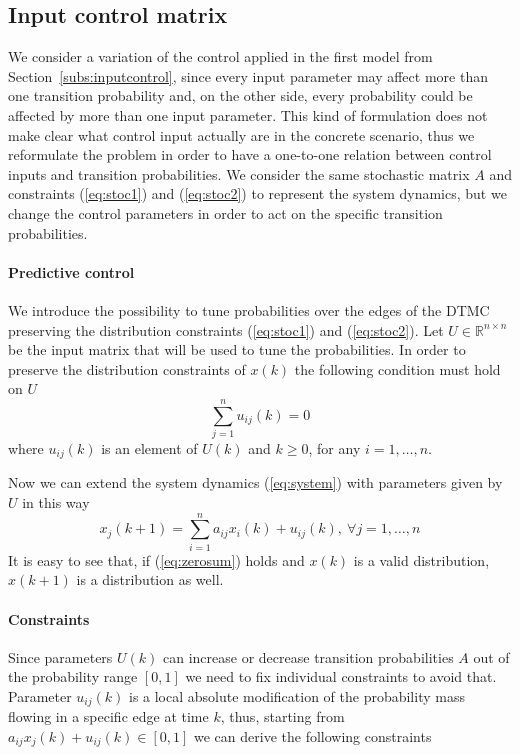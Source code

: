\documentclass[a4paper, 11pt]{article}
\theoremstyle{definition}
\theoremstyle{remark}
\begin{document}
\subsection{Input control matrix}
We consider a variation of the control applied in the first model from Section~\ref{subs:inputcontrol}, since every input parameter may affect more than one transition probability and, on the other side, every probability could be affected by more than one input parameter. This kind of formulation does not make clear what control input actually are in the concrete scenario, thus we reformulate the problem in order to have a one-to-one relation between control inputs and transition probabilities. We consider the same stochastic matrix $A$ and constraints (\ref{eq:stoc1}) and (\ref{eq:stoc2}) to represent the system dynamics, but we change the control parameters in order to act on the specific transition probabilities.

\paragraph{Predictive control}
We introduce the possibility to tune probabilities over the edges of the DTMC preserving the distribution constraints (\ref{eq:stoc1}) and (\ref{eq:stoc2}). Let $U \in \mathbb{R}^{n\times n}$ be the input matrix that will be used to tune the probabilities. In order to preserve the distribution constraints of $x(k)$ the following condition must hold on $U$
\begin{equation} \label{eq:zerosum}
	\sum_{j=1}^n u_{ij}(k) = 0
\end{equation}
where $u_{ij}(k)$ is an element of $U(k)$ and $k \geq 0$, for any $i = 1,\dots,n$.

Now we can extend the system dynamics (\ref{eq:system}) with parameters given by $U$ in this way
\begin{equation} \label{eq:system_extended}
	x_j(k+1) = \sum_{i=1}^n a_{ij} x_i(k) + u_{ij}(k), \ \forall j = 1,\dots,n
\end{equation}
It is easy to see that, if (\ref{eq:zerosum}) holds and $x(k)$ is a valid distribution, $x(k+1)$ is a distribution as well.

\paragraph{Constraints}
Since parameters $U(k)$ can increase or decrease transition probabilities $A$ out of the probability range $[0,1]$ we need to fix individual constraints to avoid that. Parameter $u_{ij}(k)$ is a local absolute modification of the probability mass flowing in a specific edge at time $k$, thus, starting from $a_{ij}x_j(k)+u_{ij}(k) \in [0,1]$ we can derive the following constraints
\end{document}

